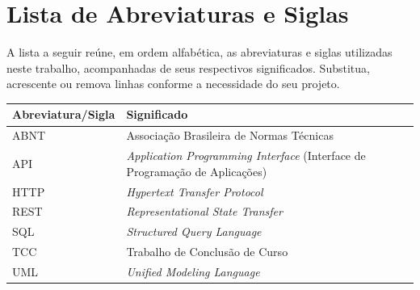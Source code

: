 \documentclass[
    12pt,                %
    openright,           %
    oneside,             %
    a4paper,             %
    english,             %
    brazil               %
]{abntex2}
\begin{document}
\chapter*{Lista de Abreviaturas e Siglas}

\noindent A lista a seguir reúne, em ordem alfabética, as abreviaturas e siglas utilizadas neste trabalho, acompanhadas de seus respectivos significados. Substitua, acrescente ou remova linhas conforme a necessidade do seu projeto.

\vspace{\onelineskip}

\begin{center}
\begin{tabular}{@{}p{3.2cm}p{}@{}}
\toprule
\textbf{Abreviatura/Sigla} & \textbf{Significado} \\
\midrule
ABNT  & Associação Brasileira de Normas Técnicas \\
API   & \textit{Application Programming Interface} (Interface de Programação de Aplicações) \\
HTTP  & \textit{Hypertext Transfer Protocol} \\
REST  & \textit{Representational State Transfer} \\
SQL   & \textit{Structured Query Language} \\
TCC   & Trabalho de Conclusão de Curso \\
UML   & \textit{Unified Modeling Language} \\
\bottomrule
\end{tabular}
\end{center}
\end{document}
